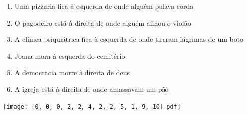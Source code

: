 \documentclass[12pt]{article}
\begin{document}
		 

\pagebreak


	\begin{enumerate}
		  \sffamily %
		  \large %


\vfill \item
Uma pizzaria fica	%
à esquerda
de onde alguém pulava corda	%

\vfill \item
O pagodeiro está	%
à direita
de onde alguém afinou o violão	%

\vfill \item
A clínica psiquiátrica fica	%
à esquerda
de onde tiraram lágrimas de um boto	%

\vfill \item
Joana mora	%
à esquerda
do cemitério	%

\vfill \item
A democracia morre	%
à direita
de deus	%

\vfill \item
A igreja está	%
à direita
de onde amassavam um pão	%
	\end{enumerate}
		  
		  \hfill

		  \vfill

\texttt{[image: [0, 0, 0, 2, 2, 4, 2, 2, 5, 1, 9, 10].pdf]}


	\hfill	  	  


\pagebreak			
\end{document}
